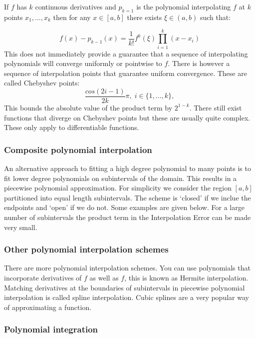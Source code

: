 \documentclass[
]{article}
\begin{document}
If \(f\) has \(k\) continuous derivatives and \(p_{k=1}\) is the
polynomial interpolating \(f\) at \(k\) points \(x_{1},...,x_{k}\) then
for any \(x \in [a,b]\) there exists \(\xi \in (a,b)\) such that:

\[f(x) - p_{k-1}(x) = \frac{1}{k!}f^{k}(\xi)\prod_{i=1}^{k}(x-x_{i})\]
This does not immediately provide a guarantee that a sequence of
interpolating polynomials will converge uniformly or pointwise to \(f\).
There is however a sequence of interpolation points that guarantee
uniform convergence. These are called Chebyshev points:
\[ \frac{cos(2i-1)}{2k}\pi, \; i \in \{1,...,k \},\] This bounds the
absolute value of the product term by \(2^{1-k}\). There still exist
functions that diverge on Chebyshev points but these are usually quite
complex. These only apply to differentiable functions.

\hypertarget{composite-polynomial-interpolation}{%
\subsubsection{Composite polynomial
interpolation}\label{composite-polynomial-interpolation}}

An alternative approach to fitting a high degree polynomial to many
points is to fit lower degree polynomials on subintervals of the domain.
This results in a piecewise polynomial approximation. For simplicity we
consider the region \([a,b]\) partitioned into equal length
subintervals. The scheme is `closed' if we inclue the endpoints and
`open' if we do not. Some examples are given below. For a large number
of subintervals the product term in the Interpolation Error can be made
very small.

\hypertarget{other-polynomial-interpolation-schemes}{%
\subsubsection{Other polynomial interpolation
schemes}\label{other-polynomial-interpolation-schemes}}

There are more polynomial interpolation schemes. You can use polynomials
that incorporate derivatives of \(f\) as well as \(f\), this is known as
Hermite interpolation. Matching derivatives at the boundaries of
subintervals in piecewise polynomial interpolation is called spline
interpolation. Cubic splines are a very popular way of approximating a
function.

\hypertarget{polynomial-integration}{%
\subsubsection{Polynomial integration}\label{polynomial-integration}}
\end{document}
